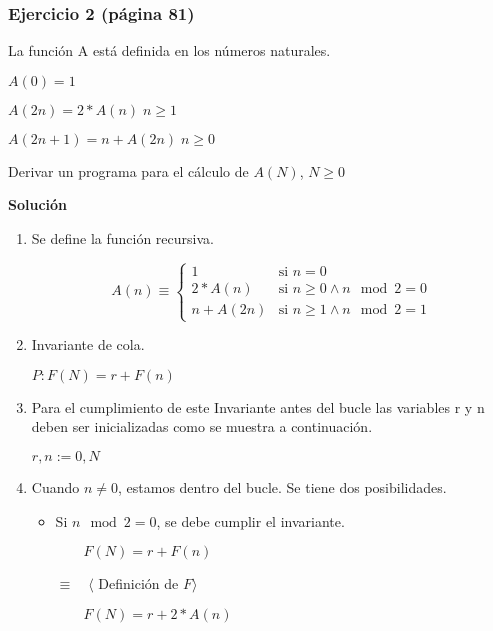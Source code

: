 \documentclass[hidelinks]{article}
\begin{document}
\newpage

\subsubsection{Ejercicio 2 (página 81)}

La función A está definida en los números naturales.\par

$A(0) = 1$\par
$A(2n) = 2*A(n) \; n \geq 1$\par
$A(2n + 1) = n + A(2n) \; n \geq 0$\par

Derivar un programa para el cálculo de $A(N)$, $N \geq 0$\par

\textbf{Solución}\par

\begin{enumerate}
	\item Se define la función recursiva.\par
	      \begin{equation}
		      A(n) \equiv
		      \begin{cases}
			      1         & \text{si } n = 0                       \\
			      2*A(n)    & \text{si } n \geq 0 \land n \mod 2 = 0 \\
			      n + A(2n) & \text{si } n \geq 1 \land n \mod 2 = 1
		      \end{cases}
	      \end{equation} \par

	\item Invariante de cola.\par
	      \begin{center}
		      $P: F(N) = r + F(n)$
	      \end{center}

	\item Para el cumplimiento de este Invariante antes del bucle las variables r y n
	      deben ser inicializadas como se muestra a continuación.\par
	      \begin{center}
		      $r,n := 0, N$
	      \end{center}
	\item Cuando $n \neq 0$, estamos dentro del bucle. Se tiene dos posibilidades.\par

	      \begin{itemize}
		      \item Si $n \mod 2 = 0$, se debe cumplir el invariante.\par
		            $\qquad F(N) = r + F(n)$\par
		            $\equiv \quad \langle$ Definición de $F \rangle$\par
		            $\qquad F(N) = r + 2*A(n)$\par
	      \end{itemize}

\end{enumerate}
\end{document}
